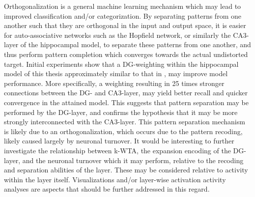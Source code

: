 Orthogonalization is a general machine learning mechanism which may lead to improved classification and/or categorization. By separating patterns from one another such that they are orthogonal in the input and output space, it is easier for auto-associative networks such as the Hopfield network, or similarly the CA3-layer of the hippocampal model, to separate these patterns from one another, and thus perform pattern completion which converges towards the actual undistorted target.
Initial experiments show that a DG-weighting within the hippocampal model of this thesis approximately similar to that in \citep{Wakagi2008}, may improve model performance. More specifically, a weighting resulting in 25 times stronger connections between the DG- and CA3-layer, may yield better recall and quicker convergence in the attained model. This suggests that pattern separation may be performed by the DG-layer, and confirms the hypothesis that it may be more strongly interconnected with the CA3-layer. This pattern separation mechanism is likely due to an orthogonalization, which occurs due to the pattern recoding, likely caused largely by neuronal turnover. It would be interesting to further investigate the relationship between k-WTA, the expansion encoding of the DG-layer, and the neuronal turnover which it may perform, relative to the recoding and separation abilities of the layer. These may be considered relative to activity within the layer itself. Visualizations and/or layer-wise activation activity analyses are aspects that should be further addressed in this regard.

